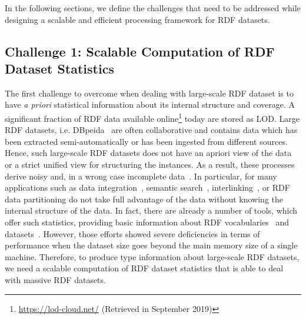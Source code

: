 In the following sections, we define the challenges that need to be addressed while designing a scalable and efficient processing framework for RDF datasets.

\subsection{Challenge 1: Scalable Computation of RDF Dataset Statistics}
The first challenge to overcome when dealing with large-scale RDF dataset is to have \textit{a priori} statistical information about its internal structure and coverage.
A significant fraction of RDF data available online\footnote{\scriptsize \url{https://lod-cloud.net/} (Retrieved in September 2019)} today are stored as \gls{LOD}.
Large RDF datasets, i.e. DBpeida~\cite{dbpedia-swj} are often collaborative and contains data which has been extracted semi-automatically or has been ingested from different sources.
Hence, such large-scale RDF datasets does not have an apriori view of the data or a strict unified view for structuring the instances.
As a result, these processes derive noisy and, in a wrong case incomplete data~\cite{zaveri2015quality}.
In particular, for many applications such as data integration~\cite{michel:tel-01508602}, semantic search~\cite{Tonon2012CII}, interlinking~\cite{Dutta2014PAI}, or RDF data partitioning do not take full advantage of the data without knowing the internal structure of the data.
In fact, there are already a number of tools, which offer such statistics, providing basic information about \gls{RDF} vocabularies~\cite{vandenbussche2015linked} and datasets~\cite{conf/dexaw/LangeggerW09,ermilov-2013-kesw}.
However, those efforts showed severe deficiencies in terms of performance when the dataset size goes beyond the main memory size of a single machine.
Therefore, to produce type information about large-scale RDF datasets, we need a scalable computation of RDF dataset statistics that is able to deal with massive RDF datasets.

